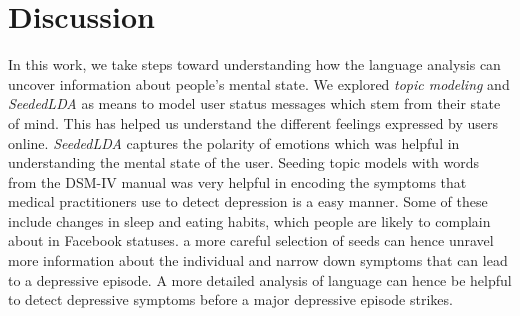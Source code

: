 \section{Discussion}
\label{sec:disc}

In this work, we take steps toward understanding how the language analysis can uncover information about people's mental state. We explored \textit{topic modeling} and \textit{SeededLDA} as means to model user status messages which stem from their state of mind. This has helped us understand the different feelings expressed by users online. \textit{SeededLDA} captures the polarity of emotions which was helpful in understanding the mental state of the user. Seeding topic models with words from the  DSM-IV manual was very helpful in encoding the symptoms that medical practitioners use to detect depression is a easy manner. Some of these include changes in sleep and eating habits, which people are likely to complain about in Facebook statuses. a more careful selection of seeds can hence unravel more information about the individual and narrow down symptoms that can lead to a depressive episode. A more detailed analysis of language can hence be helpful to detect depressive symptoms before a major depressive episode strikes.